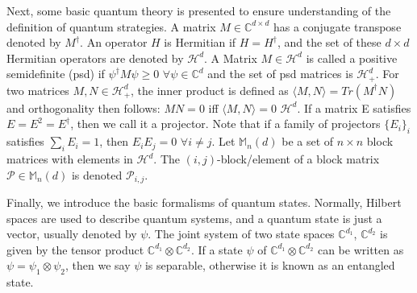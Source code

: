 \documentclass[12pt]{article}
\begin{document}
Next, some basic quantum theory is presented to ensure understanding of the definition of quantum strategies. A matrix $M \in \mathbb{C}^{d \times d}$ has a conjugate transpose denoted by $M^\dag$. An operator $H$ is Hermitian if $H = {H^{\dag}}$, and the set of these $d \times d$ Hermitian operators are denoted by $\mathcal{H}^d$. A Matrix $M \in \mathcal{H}^d$ is called a positive semidefinite (psd) if $\psi^\dag M \psi \geq 0$ $\forall \psi \in \mathbb{C}^d$ and the set of psd matrices is $\mathcal{H}^d_+$. For two matrices $M, N \in \mathcal{H}^d_+$, the inner product is defined as $\langle M, N\rangle = Tr(M^\dag N)$ and orthogonality then follows: $MN = 0$ iff $\langle M, N \rangle = 0$ $\mathcal{H}^d$. If a matrix E satisfies $E = E^2 = E^\dag$, then we call it a projector. Note that if a family of projectors $\{E_i\}_i$ satisfies $\sum_iE_i = 1$, then $E_iE_j = 0$ $\forall i \neq j$. Let $\mathbb{M}_n(d)$ be a set of $n \times n$ block matrices with elements in $\mathcal{H}^d$. The $(i, j)$-block/element of a block matrix $\mathcal{P} \in \mathbb{M}_n(d)$ is denoted $\mathcal{P}_{i, j}$.

Finally, we introduce the basic formalisms of quantum states. Normally, Hilbert spaces are used to describe quantum systems, and a quantum state is just a vector, usually denoted by $\psi$. The joint system of two state spaces $\mathbb{C}^{d_1}$, $\mathbb{C}^{d_2}$ is given by the tensor product $\mathbb{C}^{d_1} \otimes \mathbb{C}^{d_2}$. If a state $\psi$ of $\mathbb{C}^{d_1} \otimes \mathbb{C}^{d_2}$ can be written as $\psi = \psi_1 \otimes \psi_2$, then we say $\psi$ is separable, otherwise it is known as an entangled state.
\end{document}
